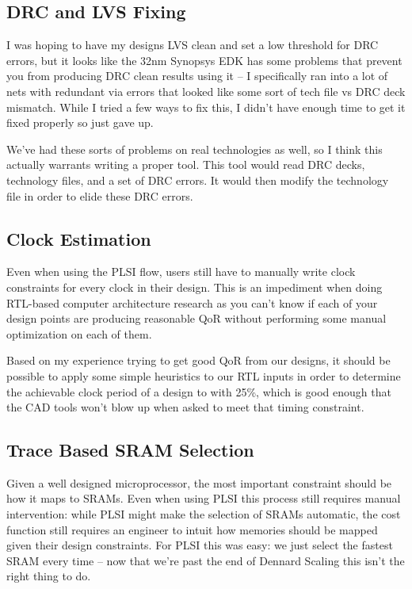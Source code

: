 \documentclass{article}
\begin{document}
\subsection{DRC and LVS Fixing}

I was hoping to have my designs LVS clean and set a low threshold for DRC
errors, but it looks like the 32nm Synopsys EDK has some problems that prevent
you from producing DRC clean results using it -- I specifically ran into a lot
of nets with redundant via errors that looked like some sort of tech file vs
DRC deck mismatch.  While I tried a few ways to fix this, I didn't have enough
time to get it fixed properly so just gave up.

We've had these sorts of problems on real technologies as well, so I think this
actually warrants writing a proper tool.  This tool would read DRC decks,
technology files, and a set of DRC errors.  It would then modify the technology
file in order to elide these DRC errors.

\subsection{Clock Estimation}

Even when using the PLSI flow, users still have to manually write clock
constraints for every clock in their design.  This is an impediment when doing
RTL-based computer architecture research as you can't know if each of your
design points are producing reasonable QoR without performing some manual
optimization on each of them.

Based on my experience trying to get good QoR from our designs, it should be
possible to apply some simple heuristics to our RTL inputs in order to
determine the achievable clock period of a design to with 25\%, which is good
enough that the CAD tools won't blow up when asked to meet that timing
constraint.

\subsection{Trace Based SRAM Selection}

Given a well designed microprocessor, the most important constraint should be
how it maps to SRAMs.  Even when using PLSI this process still requires manual
intervention: while PLSI might make the selection of SRAMs automatic, the cost
function still requires an engineer to intuit how memories should be mapped
given their design constraints.  For PLSI this was easy: we just select the
fastest SRAM every time -- now that we're past the end of Dennard Scaling this
isn't the right thing to do.
\end{document}
